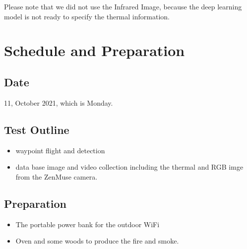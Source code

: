 \documentclass{report}
\begin{document}
Please note that we did not use the Infrared Image, because the deep learning
model is not ready to specify the thermal information.


\chapter{Schedule and Preparation}

\section{Date}
11, October 2021, which is Monday.

\section{Test Outline}
\begin{itemize}
    \item waypoint flight and detection
    \item data base image and video collection including the thermal and RGB
        imge from the ZenMuse camera.
\end{itemize}

\section{Preparation}
\begin{itemize}
    \item The portable power bank for the outdoor WiFi
    \item Oven and some woods to produce the fire and smoke.
\end{itemize}
\end{document}
